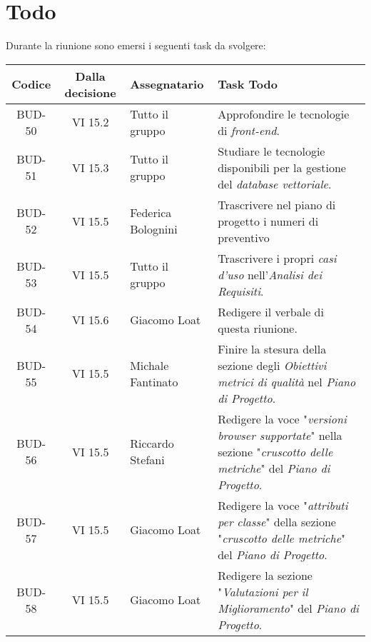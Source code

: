 
\section{Todo}

Durante la riunione sono emersi i seguenti task da svolgere:

\vspace{0.5cm}

\begin{table}[htbp]
\centering
{}
\begin{tabular}{|c|c|p{}|p{}|}
    \hline
    \rowcolor[gray]{0.75}
    \textbf{Codice} & \textbf{Dalla decisione} & \textbf{Assegnatario} & \textbf{Task Todo} \\
    \hline
    BUD-50 & VI 15.2 & Tutto il gruppo & Approfondire le tecnologie di \emph{front-end}. \\
    \hline
    BUD-51 & VI 15.3 & Tutto il gruppo & Studiare le tecnologie disponibili per la gestione del \emph{database vettoriale}. \\
    \hline
    BUD-52 & VI 15.5 & Federica Bolognini & Trascrivere nel piano di progetto i numeri di preventivo \\
    \hline
    BUD-53 & VI 15.5 & Tutto il gruppo & Trascrivere i propri \emph{casi d'uso} nell'\emph{Analisi dei Requisiti}. \\
    \hline
    BUD-54 & VI 15.6 & Giacomo Loat & Redigere il verbale di questa riunione. \\
    \hline
    BUD-55 & VI 15.5 & Michale Fantinato & Finire la stesura della sezione degli \emph{Obiettivi metrici di qualità} nel \emph{Piano di Progetto}. \\
    \hline
    BUD-56 & VI 15.5 & Riccardo Stefani & Redigere la voce "\emph{versioni browser supportate}" nella sezione "\emph{cruscotto delle metriche}" del \emph{Piano di Progetto}. \\
    \hline
    BUD-57 & VI 15.5 & Giacomo Loat & Redigere la voce "\emph{attributi per classe}" della sezione "\emph{cruscotto delle metriche}" del \emph{Piano di Progetto}. \\
    \hline
    BUD-58 & VI 15.5 & Giacomo Loat & Redigere la sezione "\emph{Valutazioni per il Miglioramento}" del \emph{Piano di Progetto}. \\
    \hline
\end{tabular}
\end{table}